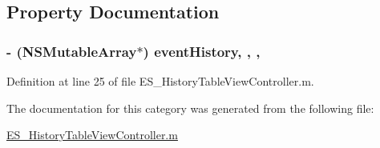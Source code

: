 \subsection{Property Documentation}
\hypertarget{category_e_s___history_table_view_controller_07_08_ace18d1966c96e263a533643a0fedf012}{
\subsubsection[{event\+History}]{\setlength{\rightskip}{0pt plus 5cm}-\/ (N\+S\+Mutable\+Array$\ast$) event\+History\hspace{0.3cm}{\ttfamily [read]}, {\ttfamily [write]}, {\ttfamily [nonatomic]}, {\ttfamily [retain]}}}\label{category_e_s___history_table_view_controller_07_08_ace18d1966c96e263a533643a0fedf012}


Definition at line 25 of file E\+S\+\_\+\+History\+Table\+View\+Controller.\+m.



The documentation for this category was generated from the following file\+:\begin{DoxyCompactItemize}
\item 
\hyperlink{_e_s___history_table_view_controller_8m}{E\+S\+\_\+\+History\+Table\+View\+Controller.\+m}\end{DoxyCompactItemize}
